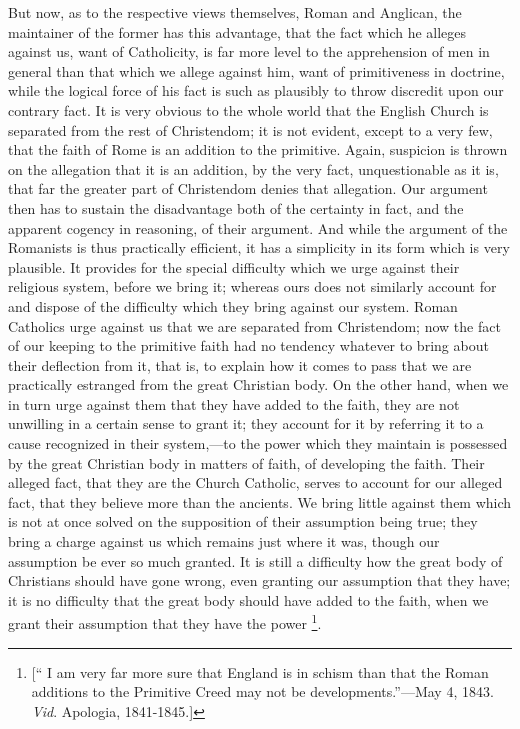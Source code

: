 But now, as to the respective views themselves,
Roman and Anglican, the maintainer of the former has this advantage,
that the fact which he alleges against us, want of Catholicity,
is far more level to the apprehension of men in general than that
which we allege against him, want of primitiveness in doctrine, while
the logical force of his fact is such as plausibly to throw discredit
upon our contrary fact. It is very obvious to the whole world that the
English Church is separated from the rest of Christendom; it is not
evident, except to a very few, that the faith of Rome is an addition
to the primitive. Again, suspicion is thrown on the allegation that it
is an addition, by the very fact, unquestionable as it is, that far
the greater part of Christendom denies that allegation. Our argument
then has to sustain the disadvantage both of the certainty in fact,
and the apparent cogency in reasoning, of their argument. And while
the argument of the Romanists is thus practically efficient, it has a
simplicity in its form which is very plausible. It provides for the
special difficulty which we urge against their religious system,
before we bring it; whereas ours does not similarly account for and
dispose of the difficulty which they bring against our system. Roman
Catholics urge against us that we are separated from Christendom; now
the fact of our keeping to the primitive faith had no tendency
whatever to bring about their deflection from it, that is, to explain
how it comes to pass that we are practically estranged from the great
Christian body. On the other hand, when we in turn urge against them
that they have added to the faith, they are not unwilling in a certain
sense to grant it; they account for it by referring it to a cause
recognized in their system,—to the power which they maintain is
possessed by the great Christian body in matters of faith, of
developing the faith. Their alleged fact, that they are the Church
Catholic, serves to account for our alleged fact, that they
believe more than the ancients. We bring little against them which is
not at once solved on the supposition of their assumption being true;
they bring a charge against us which remains just where it was, though
our assumption be ever so much granted. It is still a difficulty how
the great body of Christians should have gone wrong, even granting our
assumption that they have; it is no difficulty that the great body
should have added to the faith, when we grant their assumption that
they have the power \footnote{[`` I am very far more sure that England is in schism than that the
Roman additions to the Primitive Creed may not be developments.''—May
4, 1843. \emph{Vid}. Apologia, 1841-1845.]}.

